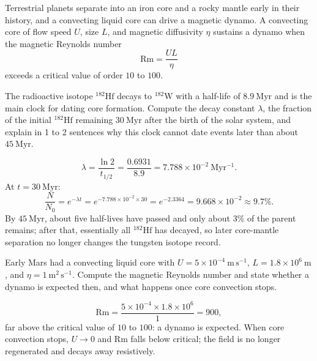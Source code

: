 
Terrestrial planets separate into an iron core and a rocky mantle early in their history, and a convecting liquid core can drive a magnetic dynamo.
A convecting core of flow speed $U$, size $L$, and magnetic diffusivity $\eta$ sustains a dynamo when the magnetic Reynolds number
\[
  \mathrm{Rm} = \frac{U L}{\eta}
\]
exceeds a critical value of order $10$ to $100$.

\parti {} The radioactive isotope $^{182}\mathrm{Hf}$ decays to $^{182}\mathrm{W}$ with a half-life of $8.9\ \mathrm{Myr}$ and is the main clock for dating core formation.
Compute the decay constant $\lambda$, the fraction of the initial $^{182}\mathrm{Hf}$ remaining $30\ \mathrm{Myr}$ after the birth of the solar system, and explain in 1 to 2 sentences why this clock cannot date events later than about $45\ \mathrm{Myr}$.

\begin{solution}
\[
  \lambda = \frac{\ln 2}{t_{1/2}} = \frac{0.6931}{8.9} = 7.788 \times 10^{-2}\ \mathrm{Myr^{-1}}.
\]
At $t = 30\ \mathrm{Myr}$:
\[
  \frac{N}{N_0} = e^{-\lambda t} = e^{-7.788 \times 10^{-2} \times 30} = e^{-2.3364} = 9.668 \times 10^{-2} \approx 9.7\%.
\]
By $45\ \mathrm{Myr}$, about five half-lives have passed and only about $3\%$ of the parent remains; after that, essentially all $^{182}\mathrm{Hf}$ has decayed, so later core-mantle separation no longer changes the tungsten isotope record.
\end{solution}

\parti {} Early Mars had a convecting liquid core with $U = 5 \times 10^{-4}\ \mathrm{m\,s^{-1}}$, $L = 1.8 \times 10^{6}\ \mathrm{m}$, and $\eta = 1\ \mathrm{m^2\,s^{-1}}$.
Compute the magnetic Reynolds number and state whether a dynamo is expected then, and what happens once core convection stops.

\begin{solution}
\[
  \mathrm{Rm} = \frac{5 \times 10^{-4} \times 1.8 \times 10^{6}}{1} = 900,
\]
far above the critical value of $10$ to $100$: a dynamo is expected.
When core convection stops, $U \to 0$ and $\mathrm{Rm}$ falls below critical; the field is no longer regenerated and decays away resistively.
\end{solution}

